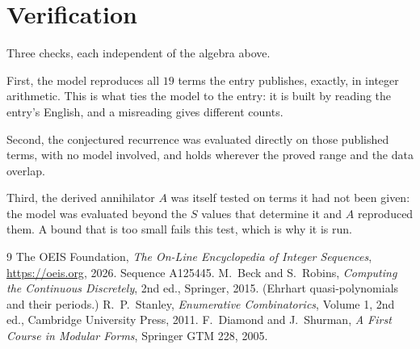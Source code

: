 \documentclass[11pt,a4paper]{article}
\theoremstyle{plain}
\theoremstyle{definition}
\begin{document}
\section{Verification}

Three checks, each independent of the algebra above.

First, the model reproduces all $19$ terms the entry publishes, exactly, in integer
arithmetic. This is what ties the model to the entry: it is built by reading the entry's
English, and a misreading gives different counts.

Second, the conjectured recurrence was evaluated directly on those published terms, with no
model involved, and holds wherever the proved range and the data overlap.

Third, the derived annihilator $A$ was itself tested on terms it had not been given: the model
was evaluated beyond the $S$ values that determine it and $A$ reproduced them. A bound that is
too small fails this test, which is why it is run.

\begin{thebibliography}{9}
 The OEIS Foundation, \emph{The On-Line Encyclopedia of Integer
Sequences}, \url{https://oeis.org}, 2026. Sequence A125445.
 M.~Beck and S.~Robins, \emph{Computing the Continuous Discretely},
2nd ed., Springer, 2015. (Ehrhart quasi-polynomials and their periods.)
 R.~P.~Stanley, \emph{Enumerative Combinatorics}, Volume 1, 2nd ed.,
Cambridge University Press, 2011.
 F.~Diamond and J.~Shurman, \emph{A First Course in Modular Forms},
Springer GTM 228, 2005.
\end{thebibliography}
\end{document}
